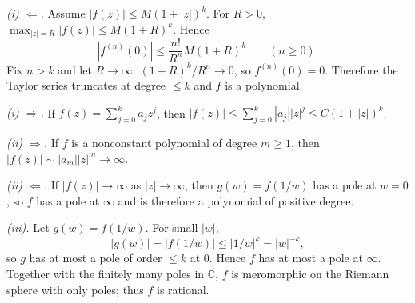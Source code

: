 \begin{solution}
\emph{(i) $\Leftarrow$.}
Assume $|f(z)|\le M(1+|z|)^k$. For $R>0$, $\max_{|z|=R}|f(z)|\le M(1+R)^k$. Hence
\[
|f^{(n)}(0)|\le \frac{n!}{R^n}M(1+R)^k \qquad (n\ge 0).
\]
Fix $n>k$ and let $R\to\infty$: $(1+R)^k/R^n\to 0$, so $f^{(n)}(0)=0$. Therefore the Taylor series truncates at degree $\le k$ and $f$ is a polynomial.

\smallskip
\emph{(i) $\Rightarrow$.}
If $f(z)=\sum_{j=0}^k a_j z^j$, then $|f(z)|\le \sum_{j=0}^k |a_j||z|^j \le C(1+|z|)^k$.

\medskip
\emph{(ii) $\Rightarrow$.}
If $f$ is a nonconstant polynomial of degree $m\ge 1$, then $|f(z)|\sim |a_m||z|^m\to\infty$.

\emph{(ii) $\Leftarrow$.}
If $|f(z)|\to\infty$ as $|z|\to\infty$, then $g(w)=f(1/w)$ has a pole at $w=0$, so $f$ has a pole at $\infty$ and is therefore a polynomial of positive degree.

\medskip
\emph{(iii).}
Let $g(w)=f(1/w)$. For small $|w|$,
\[
|g(w)|=|f(1/w)|\le |1/w|^k=|w|^{-k},
\]
so $g$ has at most a pole of order $\le k$ at $0$. Hence $f$ has at most a pole at $\infty$. Together with the finitely many poles in $\mathbb C$, $f$ is meromorphic on the Riemann sphere with only poles; thus $f$ is rational.
\end{solution}

